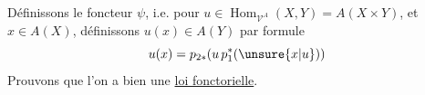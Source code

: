 
Définissons le foncteur $\psi$,  i.e. pour
$u\in\operatorname{Hom}_{\mathcal V^A}(X,Y)=A(X\times Y)$, et $x\in A(X)$, définissons $u(x)\in A(Y)$
par formule 
\[
u(x)=p_{2*}(u\,p_1^*(\unsure{x|u}))
\]
Prouvons que l'on a bien une \uline{loi fonctorielle}.
